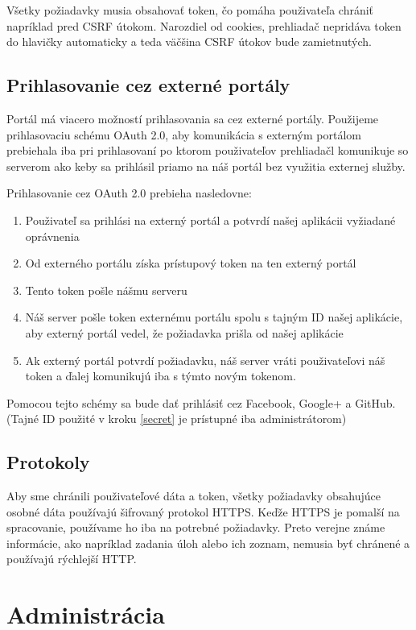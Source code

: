 Všetky požiadavky musia obsahovať token, čo pomáha použivateľa chrániť napríklad pred CSRF útokom. Narozdiel od cookies,
prehliadač nepridáva token do hlavičky automaticky a teda väčšina CSRF útokov bude zamietnutých.

\subsection{Prihlasovanie cez externé portály}
\label{oAuth}
Portál má viacero možností prihlasovania sa cez externé portály. Použijeme prihlasovaciu schému OAuth 2.0, aby komunikácia s externým
portálom prebiehala iba pri prihlasovaní po ktorom použivateľov prehliadačl komunikuje so serverom ako keby sa prihlásil priamo na náš portál bez využitia externej služby.

Prihlasovanie cez OAuth 2.0 prebieha nasledovne:
\begin{enumerate}
\item{Použivateľ sa prihlási na externý portál a potvrdí našej aplikácii vyžiadané oprávnenia}
\item{Od externého portálu získa prístupový token na ten externý portál}
\item \label{secret}{Tento token pošle nášmu serveru}
\item{Náš server pošle token externému portálu spolu s tajným ID našej aplikácie, aby externý portál vedel, že požiadavka prišla od našej aplikácie}
\item{Ak externý portál potvrdí požiadavku, náš server vráti použivateľovi náš token a ďalej komunikujú iba s týmto novým tokenom.}
\end{enumerate}

Pomocou tejto schémy sa bude dať prihlásiť cez Facebook, Google+ a GitHub.
\newline
(Tajné ID použité v kroku \ref{secret} je prístupné iba administrátorom)

\subsection{Protokoly}
Aby sme chránili použivateľové dáta a token, všetky požiadavky obsahujúce osobné dáta používajú šifrovaný protokol HTTPS. Keďže HTTPS je pomalší na spracovanie,
používame ho iba na potrebné požiadavky. Preto verejne známe informácie, ako napríklad zadania úloh alebo ich zoznam, nemusia byť chránené a používajú rýchlejší HTTP.
\section{Administrácia}
